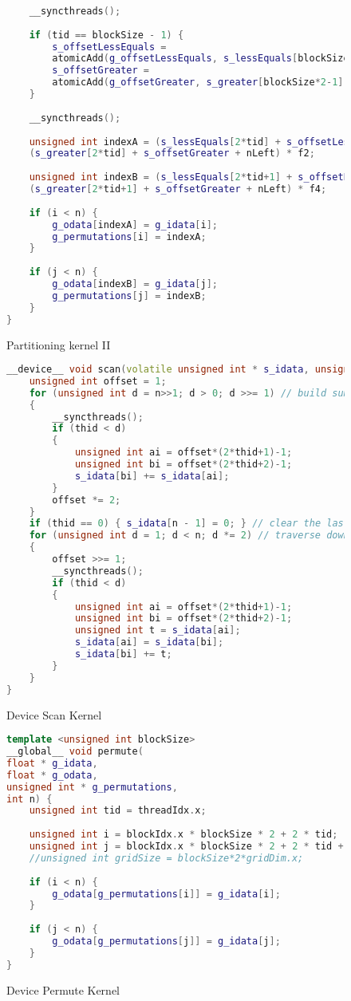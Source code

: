 \documentclass[]{article}
\begin{document}
\begin{figure}
\begin{lstlisting}[language=c++]
	
	__syncthreads();
	
	if (tid == blockSize - 1) {
		s_offsetLessEquals = 
		atomicAdd(g_offsetLessEquals, s_lessEquals[blockSize*2-1] + f3);
		s_offsetGreater = 
		atomicAdd(g_offsetGreater, s_greater[blockSize*2-1] + f4);
	}
	
	__syncthreads();
	
	unsigned int indexA = (s_lessEquals[2*tid] + s_offsetLessEquals) * f1 +
	(s_greater[2*tid] + s_offsetGreater + nLeft) * f2;
	
	unsigned int indexB = (s_lessEquals[2*tid+1] + s_offsetLessEquals) * f3 +
	(s_greater[2*tid+1] + s_offsetGreater + nLeft) * f4;
	
	if (i < n) {
		g_odata[indexA] = g_idata[i];
		g_permutations[i] = indexA;
	}
	
	if (j < n) {
		g_odata[indexB] = g_idata[j];
		g_permutations[j] = indexB;
	}
}
	\end{lstlisting}
	\caption{Partitioning kernel II}
	\label{cuda:partitionII]}
\end{figure}


\begin{figure}[H]
	\begin{lstlisting}[language=c++]
__device__ void scan(volatile unsigned int * s_idata, unsigned int thid, unsigned int n) {
	unsigned int offset = 1;
	for (unsigned int d = n>>1; d > 0; d >>= 1) // build sum in place up the tree
	{
		__syncthreads();
		if (thid < d)
		{
			unsigned int ai = offset*(2*thid+1)-1;
			unsigned int bi = offset*(2*thid+2)-1;
			s_idata[bi] += s_idata[ai];
		}
		offset *= 2;
	}
	if (thid == 0) { s_idata[n - 1] = 0; } // clear the last element
	for (unsigned int d = 1; d < n; d *= 2) // traverse down tree & build scan
	{
		offset >>= 1;
		__syncthreads();
		if (thid < d)
		{
			unsigned int ai = offset*(2*thid+1)-1;
			unsigned int bi = offset*(2*thid+2)-1;
			unsigned int t = s_idata[ai];
			s_idata[ai] = s_idata[bi];
			s_idata[bi] += t;
		}
	}
}
	\end{lstlisting}
	\caption{Device Scan Kernel}
	\label{cuda:scan}
\end{figure}



\begin{figure}[H]
	\begin{lstlisting}[language=c++]
template <unsigned int blockSize>
__global__ void permute(
float * g_idata,
float * g_odata,
unsigned int * g_permutations,
int n) {
	unsigned int tid = threadIdx.x;
	
	unsigned int i = blockIdx.x * blockSize * 2 + 2 * tid;
	unsigned int j = blockIdx.x * blockSize * 2 + 2 * tid + 1;
	//unsigned int gridSize = blockSize*2*gridDim.x;
	
	if (i < n) {
		g_odata[g_permutations[i]] = g_idata[i];
	}
	
	if (j < n) {
		g_odata[g_permutations[j]] = g_idata[j];
	}
}
	\end{lstlisting}
	\caption{Device Permute Kernel}
	\label{cuda:permute}
\end{figure}
\end{document}
